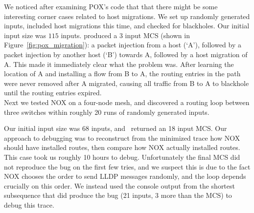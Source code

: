  We noticed after examining POX's code
that that there might be some interesting corner cases related to host migrations.
We set up randomly generated inputs, included host
migrations this time, and checked for blackholes. Our initial input size was
$115$ inputs.
\projectname produced a $3$ input MCS (shown
in Figure~\ref{fig:pox_migration}): a packet injection from a
host (`A'), followed
by a packet injection by another host (`B') towards A, followed by a host migration of A. This made it immediately
clear what the problem was. After learning the location of A and installing a
flow from B to A, the routing entries in the path were never removed after A
migrated, causing all traffic from B to A to blackhole until the routing
entries expired.\\[0.5ex]
 Next we tested NOX on a four-node mesh, and discovered a
routing loop between three switches within
roughly 20 runs of randomly generated inputs.


Our initial input size was 68 inputs, and
\projectname~returned an 18 input MCS.
Our approach to debugging was to
reconstruct from the minimized trace how NOX should have installed routes, then compare
how NOX actually installed routes. This case took us roughly 10 hours to debug. Unfortunately the final MCS did
not reproduce the bug on the first few tries, and we suspect this is due to the fact
NOX chooses the order to send LLDP messages randomly, and the loop depends
crucially on this order. We instead used the console output from the shortest
subsequence that did produce the bug (21 inputs, 3 more than the MCS) to debug this trace.

